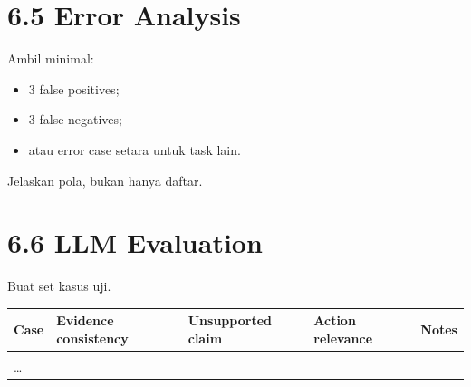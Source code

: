 \documentclass[
  indonesian,
  letterpaper,
  DIV=11,
  numbers=noendperiod]{scrreprt}
\newcounter{none} %
\providecommand{\tightlist}{%
  \setlength{\itemsep}{0pt}\setlength{\parskip}{0pt}}
\begin{document}
\section{6.5 Error Analysis}\label{error-analysis-1}

Ambil minimal:

\begin{itemize}
\tightlist
\item
  3 false positives;
\item
  3 false negatives;
\item
  atau error case setara untuk task lain.
\end{itemize}

Jelaskan pola, bukan hanya daftar.

\section{6.6 LLM Evaluation}\label{llm-evaluation}

Buat set kasus uji.

{\def\LTcaptype{none} %
\begin{longtable}[]{@{}
  >{\raggedright\arraybackslash}p{}
  >{\raggedleft\arraybackslash}p{}
  >{\raggedleft\arraybackslash}p{}
  >{\raggedleft\arraybackslash}p{}
  >{\raggedright\arraybackslash}p{}@{}}
\toprule\noalign{}
\begin{minipage}[b]{\linewidth}\raggedright
Case
\end{minipage} & \begin{minipage}[b]{\linewidth}\raggedleft
Evidence consistency
\end{minipage} & \begin{minipage}[b]{\linewidth}\raggedleft
Unsupported claim
\end{minipage} & \begin{minipage}[b]{\linewidth}\raggedleft
Action relevance
\end{minipage} & \begin{minipage}[b]{\linewidth}\raggedright
Notes
\end{minipage} \\
\midrule\noalign{}
\endhead
\bottomrule\noalign{}
\endlastfoot
1 & & & & \\
\ldots{} & & & & \\
\end{longtable}
}
\end{document}
